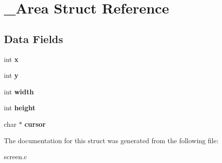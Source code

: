 \hypertarget{struct__Area}{}\section{\+\_\+\+Area Struct Reference}
\label{struct__Area}
\subsection*{Data Fields}
\begin{DoxyCompactItemize}
\item 
\mbox{\label{struct__Area_a093b8c2929094bac88bbf5ee7db85573}} 
int {\bfseries x}
\item 
\mbox{\label{struct__Area_a867e601f05480db03237c3a17d4c77f8}} 
int {\bfseries y}
\item 
\mbox{\label{struct__Area_aa2f753fc3d254821603ac4512db814f1}} 
int {\bfseries width}
\item 
\mbox{\label{struct__Area_a22627de8e529d631c17157f1f68cb5ac}} 
int {\bfseries height}
\item 
\mbox{\label{struct__Area_aa042b0549789b75fd133b67ad7d0fd9d}} 
char $\ast$ {\bfseries cursor}
\end{DoxyCompactItemize}


The documentation for this struct was generated from the following file\+:\begin{DoxyCompactItemize}
\item 
screen.\+c\end{DoxyCompactItemize}
